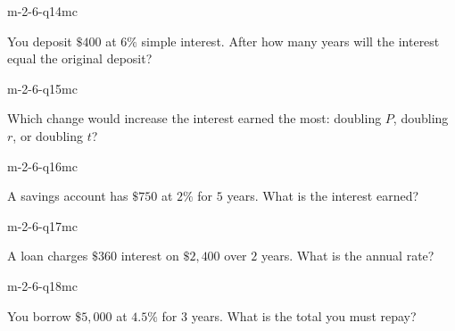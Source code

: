 \begin{practiceQuestion}{m-2-6-q14}{mc}
\begin{questionText}
You deposit $\$400$ at $6\%$ simple interest. After how many years will the interest equal the original deposit?
\end{questionText}
\end{practiceQuestion}

\begin{practiceQuestion}{m-2-6-q15}{mc}
\begin{questionText}
Which change would increase the interest earned the most: doubling $P$, doubling $r$, or doubling $t$?
\end{questionText}
\end{practiceQuestion}

\begin{practiceQuestion}{m-2-6-q16}{mc}
\begin{questionText}
A savings account has $\$750$ at $2\%$ for $5$ years. What is the interest earned?
\end{questionText}
\end{practiceQuestion}

\begin{practiceQuestion}{m-2-6-q17}{mc}
\begin{questionText}
A loan charges $\$360$ interest on $\$2{,}400$ over $2$ years. What is the annual rate?
\end{questionText}
\end{practiceQuestion}

\begin{practiceQuestion}{m-2-6-q18}{mc}
\begin{questionText}
You borrow $\$5{,}000$ at $4.5\%$ for $3$ years. What is the total you must repay?
\end{questionText}
\end{practiceQuestion}

